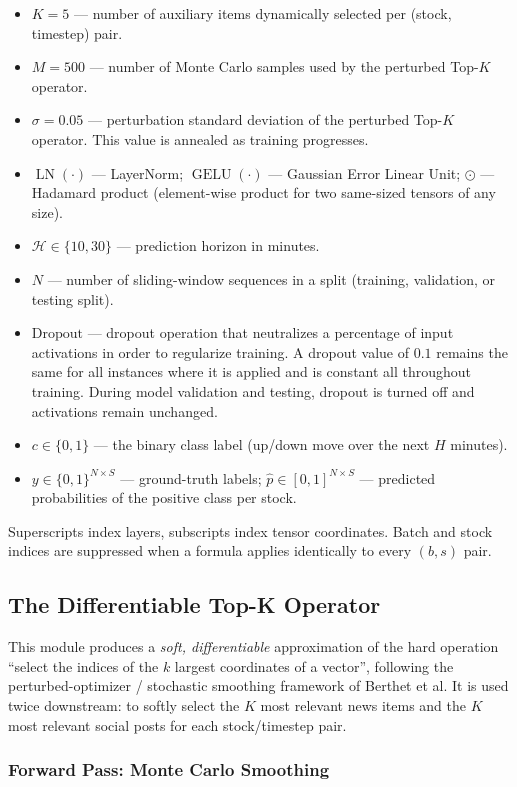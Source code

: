 \documentclass[stu,floatsintext]{apa7}
\newcommand{\LN}{\operatorname{LN}}
\newcommand{\GELU}{\operatorname{GELU}}
\begin{document}
\begin{itemize}[leftmargin=2em]
  \item $K=5$ — number of auxiliary items dynamically selected per (stock, timestep) pair.
  \item $M=500$ — number of Monte Carlo samples used by the perturbed Top-$K$ operator.
  \item $\sigma=0.05$ — perturbation standard deviation of the perturbed Top-$K$ operator. This value is annealed as training progresses.
  \item $\LN(\cdot)$ — LayerNorm; $\GELU(\cdot)$ — Gaussian Error Linear Unit; $\odot$ — Hadamard product (element-wise product for two same-sized tensors of any size).
  \item $\mathcal H\in\{10,30\}$ — prediction horizon in minutes.
  \item $N$ — number of sliding-window sequences in a split (training, validation, or testing split).
  \item $\text{Dropout}$ — dropout operation that neutralizes a percentage of input activations in order to regularize training. A dropout value of $0.1$ remains the same for all instances where it is applied and is constant all throughout training. During model validation and testing, dropout is turned off and activations remain unchanged.
  \item $c\in\{0,1\}$ — the binary class label (up/down move over the next $H$ minutes).
  \item $y\in\{0,1\}^{N\times S}$ — ground-truth labels; $\hat p\in[0,1]^{N\times S}$ — predicted probabilities of the positive class per stock.
\end{itemize}

Superscripts index layers, subscripts index tensor coordinates. Batch and stock indices are suppressed
when a formula applies identically to every $(b,s)$ pair.

\subsection{The Differentiable Top-K Operator}
\label{sec:topk}

This module produces a \emph{soft, differentiable} approximation of the hard operation ``select the
indices of the $k$ largest coordinates of a vector'', following the perturbed-optimizer / stochastic
smoothing framework of Berthet et al. It is used twice downstream: to softly select the $K$ most
relevant news items and the $K$ most relevant social posts for each stock/timestep pair.

\subsubsection{Forward Pass: Monte Carlo Smoothing}
\end{document}
